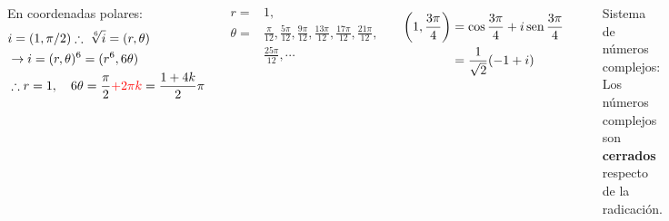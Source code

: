 \documentclass[9pt, aspectratio=169]{beamer}
\begin{document}
\begin{frame}
 \begin{columns}[t]
  \cx
  En coordenadas polares:
  \begin{align*}
   &i = (1, \pi/2) \therefore \; \sqrt[6]{i} = (r, \theta) \\
   & \rightarrow  i = (r, \theta)^6 = (r^6, 6 \theta) \\
   & \therefore r = 1, \quad 6 \theta = \frac{\pi}{2} \textcolor{red}{+ 2 \pi k} = \frac{1 + 4 k}{2} \pi
  \end{align*}
  
   \begin{align*}
   r =& 1, \\
   \theta = &\frac{\pi}{12}, \frac{5 \pi}{12}, \frac{ 9 \pi}{12}, \frac{13 \pi}{12}, \frac{17 \pi}{12}, \frac{21 \pi}{12}, \\
   &\frac{25 \pi}{12}, \cdots
  \end{align*}
  
  \begin{align*}
   \left( 1, \dfrac{3 \pi}{4} \right) &= \cos \dfrac{3 \pi}{4} + i \operatorname{sen} \dfrac{3 \pi}{4} \\
   &= \frac{1}{\sqrt{2}} (-1 + i)
  \end{align*}


  \cx
  \begin{center}
    \includegraphics[scale=0.35]{figs/raices.pdf}
  \end{center}
  
  \begin{block}{Sistema de números complejos:}
   Los números complejos son \textbf{cerrados}
   respecto de la radicación.
  \end{block} 
 \end{columns}
\end{frame}
\end{document}
